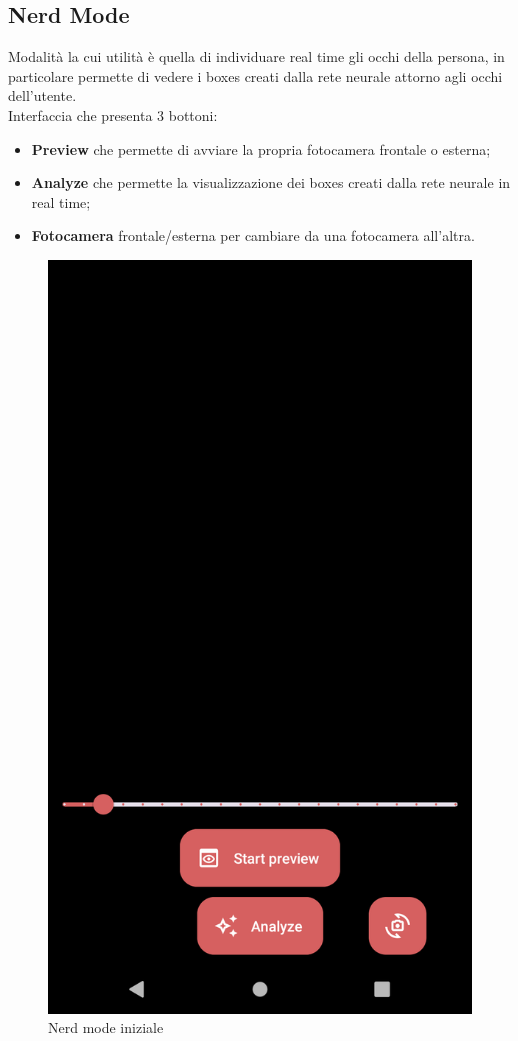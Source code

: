 \documentclass[11pt]{article}
\begin{document}
\subsection{Nerd Mode}
Modalità la cui utilità è quella di individuare real time gli occhi della persona, in particolare permette di vedere i boxes creati dalla rete neurale attorno agli occhi dell'utente.
\\Interfaccia che presenta 3 bottoni:
\begin{itemize}
    \item \textbf{Preview} che permette di avviare la propria fotocamera frontale o esterna;
    \item \textbf{Analyze} che permette la visualizzazione dei boxes creati dalla rete neurale in real time;
    \item \textbf{Fotocamera} frontale/esterna per cambiare da una fotocamera all'altra.
\end{itemize}

\begin{figure}[h]
\caption{Nerd mode iniziale }
\centering
\includegraphics[scale=0.17]{img/nerd.png}
\end{figure}
\end{document}
